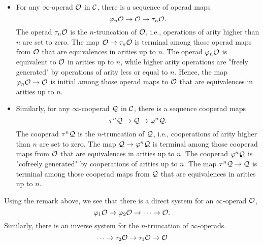 \begin{remark}
\begin{itemize}
	\item For any $\infty$-operad ${\mathcal{O}}$ in ${\mathcal{C}}$, there is a sequence of operad maps
	\[
	\varphi_n{\mathcal{O}} \to {\mathcal{O}} \to \tau_n {\mathcal{O}}.
	\]
	The operad $\tau_n{\mathcal{O}}$ is the $n$-truncation of ${\mathcal{O}}$, i.e., operations of arity higher than $n$ are set to zero.
	The map ${\mathcal{O}} \to \tau_n {\mathcal{O}}$ is terminal among those operad maps from ${\mathcal{O}}$ that are equivalences in arities up to $n$.
	The operad $\varphi_n{\mathcal{O}}$ is equivalent to ${\mathcal{O}}$ in arities up to $n$, while higher arity operations are "freely generated" by operations of arity less or equal to $n$.
	Hence, the map $\varphi_n{\mathcal{O}} \to {\mathcal{O}}$ is initial among those operad maps to ${\mathcal{O}}$ that are equivalences in arities up to $n$.

	\item Similarly, for any $\infty$-cooperad ${\mathcal{Q}}$ in ${\mathcal{C}}$, there is a sequence cooperad maps
	\[
	\tau^n {\mathcal{Q}} \to {\mathcal{Q}} \to \varphi^n {\mathcal{Q}}.
	\]
	The cooperad $\tau^n{\mathcal{Q}}$ is the $n$-truncation of ${\mathcal{Q}}$, i.e., cooperations of arity higher than $n$ are set to zero. The map ${\mathcal{Q}} \to \varphi^n{\mathcal{Q}}$ is terminal among those cooperad maps from ${\mathcal{O}}$ that are equivalences in arities up to $n$.
    The cooperad $\varphi^n {\mathcal{Q}}$ is "cofreely generated" by cooperations of arities up to $n$.
    The map $\tau^n{\mathcal{Q}} \to {\mathcal{Q}}$ is terminal among those cooperad maps from ${\mathcal{Q}}$ that are equivalences in arities up to $n$.
\end{itemize}
\end{remark}

\begin{remark}
	Using the remark above, we see that there is a direct system for an $\infty$-operad ${\mathcal{O}}$, 
\begin{equation}
\varphi_1{\mathcal{O}} \to \varphi_2{\mathcal{O}} \to \cdots \to {\mathcal{O}}.
\end{equation}
Similarly, there is an inverse system for the $n$-truncation of $\infty$-operads.
\begin{equation}
\cdots \to 
\tau_2 {\mathcal{O}}
\to 
\tau_1 {\mathcal{O}}
\to 
{\mathcal{O}}
\end{equation}
\end{remark}



